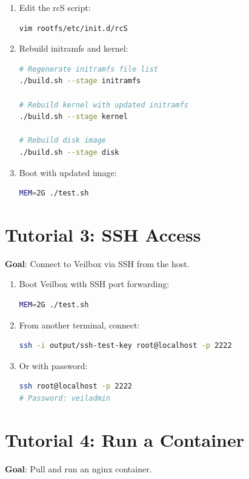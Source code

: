 \begin{enumerate}[nosep]
  \item Edit the rcS script:
\begin{lstlisting}[language=bash]
vim rootfs/etc/init.d/rcS
\end{lstlisting}
  \item Rebuild initramfs and kernel:
\begin{lstlisting}[language=bash]
# Regenerate initramfs file list
./build.sh --stage initramfs

# Rebuild kernel with updated initramfs
./build.sh --stage kernel

# Rebuild disk image
./build.sh --stage disk
\end{lstlisting}
  \item Boot with updated image:
\begin{lstlisting}[language=bash]
MEM=2G ./test.sh
\end{lstlisting}
\end{enumerate}

\section{Tutorial 3: SSH Access}

\textbf{Goal}: Connect to Veilbox via SSH from the host.

\begin{enumerate}[nosep]
  \item Boot Veilbox with SSH port forwarding:
\begin{lstlisting}[language=bash]
MEM=2G ./test.sh
\end{lstlisting}
  \item From another terminal, connect:
\begin{lstlisting}[language=bash]
ssh -i output/ssh-test-key root@localhost -p 2222
\end{lstlisting}
  \item Or with password:
\begin{lstlisting}[language=bash]
ssh root@localhost -p 2222
# Password: veiladmin
\end{lstlisting}
\end{enumerate}

\section{Tutorial 4: Run a Container}

\textbf{Goal}: Pull and run an nginx container.

